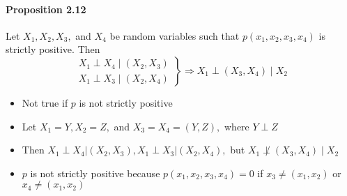 \documentclass[8pt]{article}
\begin{document}
\paragraph{Proposition 2.12} Let $X_{1}, X_{2}, X_{3},$ and $X_{4}$ be random variables such that $p\left(x_{1}, x_{2}, x_{3}, x_{4}\right)$ is strictly positive. Then
$$
\left.\begin{array}{l}
X_{1} \perp X_{4} \mid\left(X_{2}, X_{3}\right) \\
X_{1} \perp X_{3} \mid\left(X_{2}, X_{4}\right)
\end{array}\right\} \Rightarrow X_{1} \perp\left(X_{3}, X_{4}\right) \mid X_{2}
$$
\begin{itemize}
	\item Not true if $p$ is not strictly positive
	\item Let $X_{1}=Y, X_{2}=Z,$ and $X_{3}=X_{4}=(Y, Z),$ where $Y \perp Z$
	\item Then $X_{1} \perp X_{4}\left|\left(X_{2}, X_{3}\right), X_{1} \perp X_{3}\right|\left(X_{2}, X_{4}\right),$ but $X_{1} \not \perp\left(X_{3}, X_{4}\right) \mid X_{2}$
	\item $p$ is not strictly positive because $p\left(x_{1}, x_{2}, x_{3}, x_{4}\right)=0$ if $x_{3} \neq\left(x_{1}, x_{2}\right)$ or $x_{4} \neq\left(x_{1}, x_{2}\right)$
\end{itemize}
\end{document}
